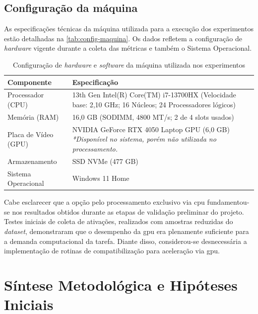\subsection{Configuração da máquina}

As especificações técnicas da máquina utilizada para a execução dos experimentos estão detalhadas na \autoref{tab:config-maquina}. Os dados refletem a configuração de \textit{hardware} vigente durante a coleta das métricas e também o Sistema Operacional.

\begin{table}[h!]
    \centering
    \caption{Configuração de \textit{hardware} e \textit{software} da máquina utilizada nos experimentos}
    \label{tab:config-maquina}
    \begin{tabular}{|l|p{10cm}|}
        \hline
        \textbf{Componente} & \textbf{Especificação} \\
        \hline
        Processador (CPU) & 13th Gen Intel(R) Core(TM) i7-13700HX \newline (Velocidade base: 2,10 GHz; 16 Núcleos; 24 Processadores lógicos) \\
        \hline
        Memória (RAM) & 16,0 GB (SODIMM, 4800 MT/s; 2 de 4 slots usados) \\
        \hline
        Placa de Vídeo (GPU) & NVIDIA GeForce RTX 4050 Laptop GPU (6,0 GB) \newline \textit{*Disponível no sistema, porém não utilizada no processamento.} \\
        \hline
        Armazenamento & SSD NVMe (477 GB) \\
        \hline
        Sistema Operacional & Windows 11 Home \\
        \hline
    \end{tabular}
    \fonte{}
\end{table}

Cabe esclarecer que a opção pelo processamento exclusivo via \gls{cpu} fundamentou-se nos resultados obtidos durante as etapas de validação preliminar do projeto. Testes iniciais de coleta de ativações, realizados com amostras reduzidas do \textit{dataset}, demonstraram que o desempenho da \gls{gpu} era plenamente suficiente para a demanda computacional da tarefa. Diante disso, considerou-se desnecessária a implementação de rotinas de compatibilização para aceleração via \gls{gpu}.

\section{Síntese Metodológica e Hipóteses Iniciais}

